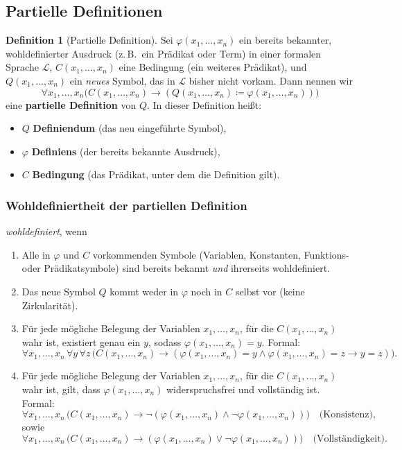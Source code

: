 \documentclass{book}
\theoremstyle{plain}
\theoremstyle{remark}
\theoremstyle{definition}
\newtheorem{definition}{Definition}[section]
\begin{document}
\subsection{Partielle Definitionen}
\begin{definition}[Partielle Definition]
Sei \(\varphi(x_1,\dots,x_n)\) ein bereits bekannter, wohldefinierter Ausdruck (z.\,B.\ ein Prädikat oder Term) in einer formalen Sprache \(\mathcal{L}\), \(C(x_1,\dots,x_n)\) eine Bedingung (ein weiteres Prädikat), und \(Q(x_1,\dots,x_n)\) ein \emph{neues} Symbol, das in \(\mathcal{L}\) bisher nicht vorkam. Dann nennen wir
\[
\forall x_1,\dots,x_n \bigl( C(x_1,\dots,x_n) \rightarrow ( Q(x_1,\dots,x_n) \coloneqq \varphi(x_1,\dots,x_n) ) \bigr)
\]
eine \textbf{partielle Definition} von \(Q\). In dieser Definition heißt:
\begin{itemize}
    \item \(Q\) \textbf{Definiendum} (das neu eingeführte Symbol),
    \item \(\varphi\) \textbf{Definiens} (der bereits bekannte Ausdruck),
    \item \(C\) \textbf{Bedingung} (das Prädikat, unter dem die Definition gilt).
\end{itemize}

\noindent
\subsubsection{Wohldefiniertheit der partiellen Definition} \emph{wohldefiniert}, wenn
\begin{enumerate}
    \item Alle in \(\varphi\) und \(C\) vorkommenden Symbole (Variablen, Konstanten, Funktions- oder Prädikatsymbole) sind bereits bekannt \emph{und} ihrerseits wohldefiniert.
    \item Das neue Symbol \(Q\) kommt weder in \(\varphi\) noch in \(C\) selbst vor (keine Zirkularität).
    \item Für jede mögliche Belegung der Variablen \(x_1,\dots,x_n\), für die \(C(x_1,\dots,x_n)\) wahr ist, existiert genau ein \(y\), sodass \(\varphi(x_1,\dots,x_n) = y\). Formal:
    \[
    \forall x_1,\dots,x_n \, \forall y \, \forall z \, \bigl( C(x_1,\dots,x_n) \rightarrow ( \varphi(x_1,\dots,x_n) = y \land \varphi(x_1,\dots,x_n) = z \rightarrow y = z ) \bigr).
    \]
    \item Für jede mögliche Belegung der Variablen \(x_1, \dots, x_n\), für die \(C(x_1,\dots,x_n)\) wahr ist, gilt, dass \(\varphi(x_1,\dots,x_n)\) widerspruchsfrei und vollständig ist. Formal:
    \[
    \forall x_1,\dots,x_n \, \bigl( C(x_1,\dots,x_n) \rightarrow \neg ( \varphi(x_1,\dots,x_n) \land \neg \varphi(x_1,\dots,x_n) ) \bigr) \quad \text{(Konsistenz)},
    \]
    sowie
    \[
    \forall x_1,\dots,x_n \, \bigl( C(x_1,\dots,x_n) \rightarrow ( \varphi(x_1,\dots,x_n) \lor \neg \varphi(x_1,\dots,x_n) ) \bigr) \quad \text{(Vollständigkeit)}.
    \]
\end{enumerate}
\end{definition}
\end{document}
